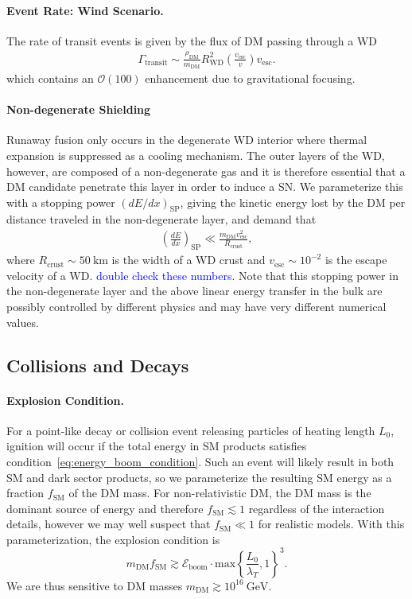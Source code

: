\documentclass[twocolumn, preprintnumbers,amsmath,amssymb,prd, superscriptaddress]{revtex4}
\newcommand{\Eboom}{\mathcal{E}_\text{boom}}
\newcommand{\OO}{\mathcal{O}}
\newcommand{\GeV}{\text{GeV}}
\def\r{\right)}
\def\l{\left(}
\begin{document}
\paragraph{Event Rate: Wind Scenario.}
The rate of transit events is given by the flux of DM passing through a WD
\begin{align}
  \Gamma_\text{transit} \sim
  \frac{\rho_{\text{DM}}}{m_\text{DM}} R_\text{WD}^2
  \l\frac{v_\text{esc}}{v}\r v_\text{esc}.
\label{eq:TransitFluxCondition}
\end{align}
which contains an $\OO(100)$ enhancement due to gravitational focusing.

\paragraph{Non-degenerate Shielding}
Runaway fusion only occurs in the degenerate WD interior where thermal expansion is suppressed as a cooling mechanism.
The outer layers of the WD, however, are composed of a non-degenerate gas and it is therefore essential that a DM candidate penetrate this layer in order to induce a SN.
We parameterize this with a stopping power $(dE/dx)_\text{SP}$, giving the kinetic energy lost by the DM per distance traveled in the non-degenerate layer, and demand that
\begin{align}
\label{eq:CrustCondition}
  \left( \frac{d E}{d x} \right)_\text{SP} \ll
  \frac{m_\text{DM} v^2_\text{esc}}{R_\text{crust}},
\end{align}
where $R_\text{crust} \sim 50 ~\text{km}$ is the width of a WD crust \cite{Chandrasekhar} and $v_\text{esc} \sim 10^{-2}$ is the escape velocity of a WD. \textcolor{blue}{double check these numbers}.
Note that this stopping power in the non-degenerate layer and the above linear energy transfer in the bulk are possibly controlled by different physics and may have very different numerical values.

\subsection{Collisions and Decays}

\paragraph{Explosion Condition.}
For a point-like decay or collision event releasing particles of heating length $L_0$, ignition will occur if the total energy in SM products satisfies condition~\eqref{eq:energy_boom_condition}.
Such an event will likely result in both SM and dark sector products, so we parameterize the resulting SM energy as a fraction $f_\text{SM}$ of the DM mass.
For non-relativistic DM, the DM mass is the dominant source of energy and therefore $f_\text{SM} \lesssim 1$ regardless of the interaction details, however we may well suspect that $f_\text{SM} \ll 1$ for realistic models.
With this parameterization, the explosion condition is
\begin{equation}
\label{eq:coldecay}
  m_\text{DM} f_\text{SM}  \gtrsim \Eboom \cdot \text{max} \left \{\frac{L_0}{\lambda_T}, 1 \right \}^3.
\end{equation}
We are thus sensitive to DM masses $m_\text{DM} \gtrsim 10^{16} ~\GeV$.
\end{document}
